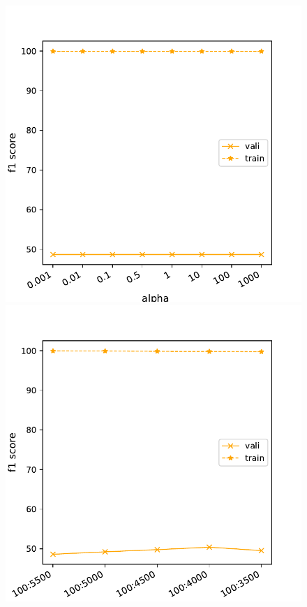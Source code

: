 \documentclass[11pt]{article}
\begin{document}
\begin{figure}[h]
\begin{minipage}[t]{0.33\textwidth}
\end{minipage}
\begin{minipage}[t]{0.33\textwidth}
\includegraphics[width=1\linewidth]{amazon/NB_alpha.pdf}
\end{minipage}
\begin{minipage}[t]{0.33\textwidth}
\includegraphics[width=1\linewidth]{amazon/NB_Xrange2.pdf}

\end{minipage}
\end{figure}
\end{document}
